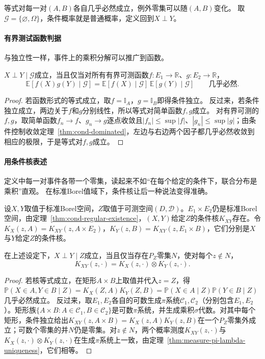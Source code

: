 等式对每一对$(A,B)$各自几乎必然成立，例外零集可以随$(A,B)$变化。
取$\mathcal G=\{\varnothing,\Omega\}$，条件概率就是普通概率，定义回到$X\perp Y$。

\paragraph{有界测试函数判据}
与独立性一样，事件上的乘积分解可以推广到函数。

\begin{lemma}[条件独立的函数判据]
\label{lem:cond-independence-functions}
$X\perp Y\mid\mathcal G$成立，当且仅当对所有有界可测函数$f:E_1\to\mathbb R$、$g:E_2\to\mathbb R$，
\[
  \mathbb E[f(X)g(Y)\mid\mathcal G]=\mathbb E[f(X)\mid\mathcal G]\,\mathbb E[g(Y)\mid\mathcal G]\qquad\text{几乎必然}.
\]
\end{lemma}

\begin{proof}
若函数形式的等式成立，取$f=\mathbb I_A$，$g=\mathbb I_B$即得条件独立。
反过来，若条件独立成立，两边关于$f$和$g$分别线性，所以等式对简单函数$f,g$成立。
对有界可测的$f,g$，取简单函数$f_n\to f$、$g_n\to g$逐点收敛且$|f_n|\leq\sup|f|$、$|g_n|\leq\sup|g|$；由条件控制收敛定理~\ref{thm:cond-dominated}，左边与右边两个因子都几乎必然收敛到相应的极限，于是等式对$f,g$成立。
\end{proof}

\paragraph{用条件核表述}
定义中每一对事件各带一个零集，读起来不如“在每个给定的条件下，联合分布是乘积”直观。
在标准Borel值域下，条件核让后一种说法变得准确。

设$X,Y$取值于标准Borel空间，$Z$取值于可测空间$(D,\mathcal D)$。$E_1\times E_2$仍是标准Borel空间，由定理~\ref{thm:cond-regular-existence}，$(X,Y)$给定$Z$的条件核$K_{XY}$存在。令$K_X(z,A)=K_{XY}(z,A\times E_2)$，$K_Y(z,B)=K_{XY}(z,E_1\times B)$，它们分别是$X$与$Y$给定$Z$的条件核。

\begin{theorem}[条件独立的核判据]
\label{thm:cond-independence-kernel}
在上述设定下，$X\perp Y\mid Z$成立，当且仅当存在$P_Z$零集$N$，使对每个$z\notin N$，
\[
  K_{XY}(z,\cdot)=K_X(z,\cdot)\otimes K_Y(z,\cdot).
\]
\end{theorem}

\begin{proof}
若核等式成立，在矩形$A\times B$上取值并代入$z=Z$，得$\mathbb P(X\in A,Y\in B\mid Z)=K_X(Z,A)K_Y(Z,B)=\mathbb P(X\in A\mid Z)\mathbb P(Y\in B\mid Z)$几乎必然成立。
反过来，取$E_1,E_2$各自的可数生成$\pi$系统$\mathcal C_1,\mathcal C_2$（分别包含$E_1,E_2$）。矩形族$\{A\times B:A\in\mathcal C_1,B\in\mathcal C_2\}$是可数$\pi$系统，并生成乘积$\sigma$代数。对其中每个矩形，条件独立给出$K_{XY}(z,A\times B)=K_X(z,A)K_Y(z,B)$在一个$P_Z$零集外成立；可数个零集的并$N$仍是零集。对$z\notin N$，两个概率测度$K_{XY}(z,\cdot)$与$K_X(z,\cdot)\otimes K_Y(z,\cdot)$在生成$\pi$系统上一致，由定理~\ref{thm:measure-pi-lambda-uniqueness}，它们相等。
\end{proof}

